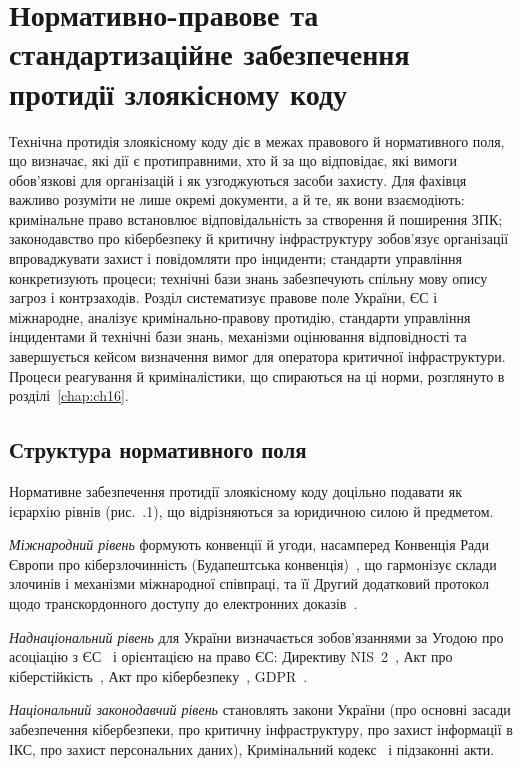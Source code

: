 \chapter{Нормативно-правове та стандартизаційне забезпечення протидії злоякісному коду}
\label{chap:ch02}

Технічна протидія злоякісному коду діє в межах правового й нормативного поля, що визначає, які дії є протиправними, хто й за що відповідає, які вимоги обов'язкові для організацій і як узгоджуються засоби захисту. Для фахівця важливо розуміти не лише окремі документи, а й те, як вони взаємодіють: кримінальне право встановлює відповідальність за створення й поширення ЗПК; законодавство про кібербезпеку й критичну інфраструктуру зобов'язує організації впроваджувати захист і повідомляти про інциденти; стандарти управління конкретизують процеси; технічні бази знань забезпечують спільну мову опису загроз і контрзаходів. Розділ систематизує правове поле України, ЄС і міжнародне, аналізує кримінально-правову протидію, стандарти управління інцидентами й технічні бази знань, механізми оцінювання відповідності та завершується кейсом визначення вимог для оператора критичної інфраструктури. Процеси реагування й криміналістики, що спираються на ці норми, розглянуто в розділі~\ref{chap:ch16}.

\section{Структура нормативного поля}\label{sec:ch02-structure}

Нормативне забезпечення протидії злоякісному коду доцільно подавати як ієрархію рівнів (рис.~\thechapter.1), що відрізняються за юридичною силою й предметом.

\emph{Міжнародний рівень} формують конвенції й угоди, насамперед Конвенція Ради Європи про кіберзлочинність (Будапештська конвенція)~\cite{budapest}, що гармонізує склади злочинів і механізми міжнародної співпраці, та її Другий додатковий протокол щодо транскордонного доступу до електронних доказів~\cite{ch02:budapest-ap}.

\emph{Наднаціональний рівень} для України визначається зобов'язаннями за Угодою про асоціацію з ЄС~\cite{ch02:assoc} і орієнтацією на право ЄС: Директиву NIS~2~\cite{nis2}, Акт про кіберстійкість~\cite{cra}, Акт про кібербезпеку~\cite{ch02:csa}, GDPR~\cite{gdpr}.

\emph{Національний законодавчий рівень} становлять закони України (про основні засади забезпечення кібербезпеки, про критичну інфраструктуру, про захист інформації в ІКС, про захист персональних даних), Кримінальний кодекс~\cite{kk-ukr} і підзаконні акти.

